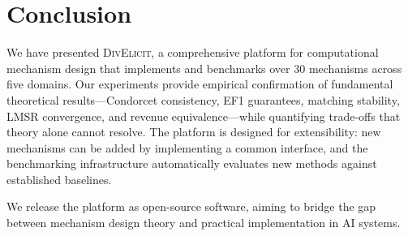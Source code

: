 \documentclass[10pt]{article}
\begin{document}
\section{Conclusion}
\label{sec:conclusion}

We have presented \textsc{DivElicit}, a comprehensive platform for computational mechanism design that implements and benchmarks over 30 mechanisms across five domains. Our experiments provide empirical confirmation of fundamental theoretical results---Condorcet consistency, EF1 guarantees, matching stability, LMSR convergence, and revenue equivalence---while quantifying trade-offs that theory alone cannot resolve. The platform is designed for extensibility: new mechanisms can be added by implementing a common interface, and the benchmarking infrastructure automatically evaluates new methods against established baselines.

We release the platform as open-source software, aiming to bridge the gap between mechanism design theory and practical implementation in AI systems.

\end{document}
